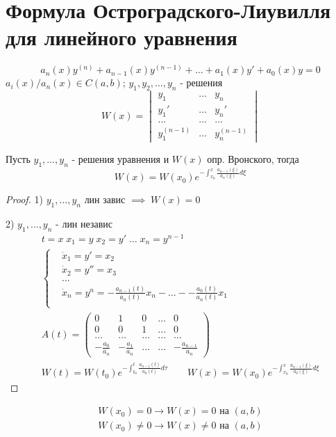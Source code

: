 \documentclass{article}
\begin{document}
\section{Формула Остроградского-Лиувилля для линейного уравнения}
\[
  a_n(x)y^{(n)}+ a_{n-1}(x)y^{(n-1)}+ \dots +  a_1(x)y' +  a_0(x)y = 0
\]
$a_i(x)/a_n(x) \in C(a,b)$; $y_1,y_2,\dots,y_n$ - решения
\[
  W(x) = \begin{vmatrix}
    y_1 & \dots & y_n \\ 
    y_1' & \dots & y_n' \\ 
    \dots & \dots & \dots \\
    y_1^{(n-1)} & \dots & y_n^{(n-1)}
  \end{vmatrix} 
\]
\begin{theorem}
  Пусть $y_1, \dots , y_n$ - решения уравнения и $W(x)$ опр. Вронского, тогда
  \[
    W(x)=W(x_0)e^{-\int_{x_0}^{x}\frac{a_{n-1}(\xi)}{a_n(\xi)}d\xi}
  \]
\end{theorem}
\begin{proof}
  1) $y_1,\dots,y_n$ лин завис $\implies \; W(x) = 0$

  2) $y_1,\dots,y_n$ - лин независ
  \begin{gather*}
    t=x \; x_1=y\; x_2=y' \; \dots \; x_n=y^{n-1} \\ 
    \left\{\begin{aligned}
      & \dot{x}_1=y'=x_2 \\
      & \dot{x}_2=y''=x_3 \\
      & \dots \\ 
      & \dot{x}_n=y^{n}=-\frac{a_{n-1}(t)}{a_n(t)}x_n-\dots- -\frac{a_{0}(t)}{a_n(t)}x_1 \\
    \end{aligned}\right. \\ 
    A(t) = \begin{pmatrix}
      0 & 1 & 0 & \dots & 0 \\ 
      0 & 0 & 1 & \dots & 0 \\ 
      \dots & \dots & \dots & \dots & \dots \\ 
      -\frac{a_0}{a_n} & -\frac{a_1}{a_n} & \dots & \dots & -\frac{a_{n-1}}{a_n}
    \end{pmatrix} \\ 
    W(t) = W(t_0) e^{-\int_{t_0}^{t}\frac{a_{n-1}(t)}{a_0(t)}d\tau} \qquad W(x) = W(x_0) e^{-\int_{x_0}^{x}\frac{a_{n-1}(\xi)}{a_0(\xi)}d\xi}
  \end{gather*}
\end{proof}
\begin{remark}
  \begin{gather*}
    W(x_0)=0 \rightarrow W(x) =0 \text{ на } (a,b) \\ 
    W(x_0)\neq0 \rightarrow W(x)\neq0 \text{ на } (a,b) \\ 
  \end{gather*}
\end{remark}
\end{document}
